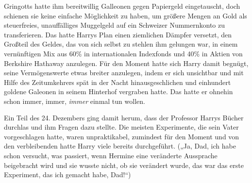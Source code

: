 Gringotts hatte ihm bereitwillig Galleonen gegen Papiergeld eingetauscht, doch schienen sie keine einfache Möglichkeit zu haben, um größere Mengen an Gold als steuerfreies, unauffälliges Muggelgeld auf ein Schweizer Nummernkonto zu transferieren. Das hatte Harrys Plan einen ziemlichen Dämpfer versetzt, den Großteil des Geldes, das von sich selbst zu stehlen ihm gelungen war, in einem vernünftigen Mix aus 60\% in internationalen Indexfonds und 40\% in Aktien von Berkshire Hathaway anzulegen.
Für den Moment hatte sich Harry damit begnügt, seine Vermögenswerte etwas breiter anzulegen, indem er sich unsichtbar und mit Hilfe des Zeitumkehrers spät in der Nacht hinausgeschlichen und einhundert goldene Galeonen in seinem Hinterhof vergraben hatte. Das hatte er ohnehin schon immer, immer, \emph{immer} einmal tun wollen.

Ein Teil des 24. Dezembers ging damit herum, dass der Professor Harrys Bücher durchlas und ihm Fragen dazu stellte. Die meisten Experimente, die sein Vater vorgeschlagen hatte, waren unpraktikabel, zumindest für den Moment und von den verbleibenden hatte Harry viele bereits durchgeführt. („Ja, Dad, ich habe schon versucht, was passiert, wenn Hermine eine veränderte Aussprache beigebracht wird und sie wusste nicht, ob sie verändert wurde, das war das erste Experiment, das ich gemacht habe, Dad!“)

